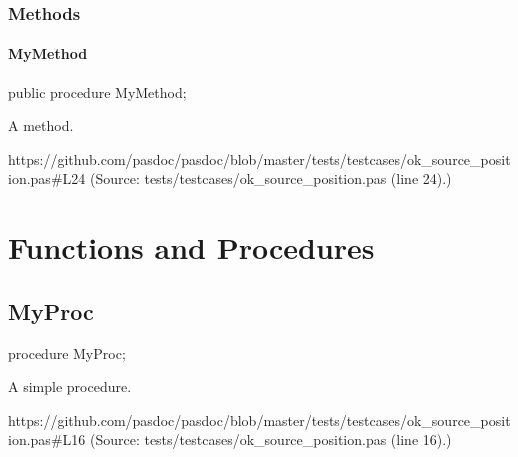 \documentclass{report}
\begin{document}
\subsubsection*{\large{\textbf{Methods}}\normalsize\hspace{1ex}\hfill}
\paragraph*{MyMethod}\hspace*{\fill}

\begin{list}{}{
\setlength{\itemindent}{0cm}
\setlength{\listparindent}{0cm}
\setlength{\leftmargin}{\evensidemargin}
\addtolength{\leftmargin}{\tmplength}
\settowidth{\labelsep}{X}
\addtolength{\leftmargin}{\labelsep}
\setlength{\labelwidth}{\tmplength}
}
\begin{flushleft}
\item[\textbf{Declaration}\hfill]
\begin{ttfamily}
public procedure MyMethod;\end{ttfamily}


\end{flushleft}
\par
\item[\textbf{Description}]
A method.\par
https://github.com/pasdoc/pasdoc/blob/master/tests/testcases/ok{\_}source{\_}position.pas{\#}L24 (Source: tests/testcases/ok{\_}source{\_}position.pas (line 24).)

\end{list}
\section{Functions and Procedures}
\subsection*{MyProc}
\begin{list}{}{
\setlength{\itemindent}{0cm}
\setlength{\listparindent}{0cm}
\setlength{\leftmargin}{\evensidemargin}
\addtolength{\leftmargin}{\tmplength}
\settowidth{\labelsep}{X}
\addtolength{\leftmargin}{\labelsep}
\setlength{\labelwidth}{\tmplength}
}
\begin{flushleft}
\item[\textbf{Declaration}\hfill]
\begin{ttfamily}
procedure MyProc;\end{ttfamily}


\end{flushleft}
\par
\item[\textbf{Description}]
A simple procedure.\par
https://github.com/pasdoc/pasdoc/blob/master/tests/testcases/ok{\_}source{\_}position.pas{\#}L16 (Source: tests/testcases/ok{\_}source{\_}position.pas (line 16).)

\end{list}
\end{document}
